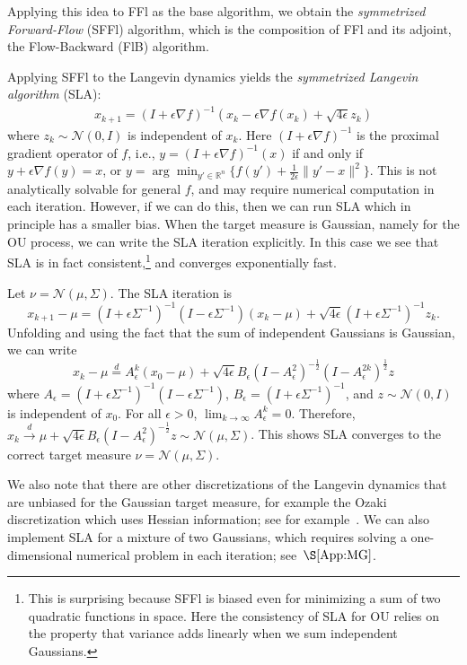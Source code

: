 \documentclass[final,12pt]{colt2018}
\newcommand{\R}{\mathbb{R}}
\newcommand{\N}{\mathcal{N}}
\begin{document}
Applying this idea to FFl as the base algorithm, we obtain the {\em symmetrized Forward-Flow} (SFFl) algorithm, which is the composition of FFl and its adjoint, the Flow-Backward (FlB) algorithm.

Applying SFFl to the Langevin dynamics yields the {\em symmetrized Langevin algorithm} (SLA):
\begin{align}\label{Eq:SLA}
x_{k+1} = (I + \epsilon \nabla f)^{-1}(x_k-\epsilon \nabla f(x_k) + \sqrt{4\epsilon} z_k)
\end{align}
where $z_k \sim \N(0,I)$ is independent of $x_k$.
Here $(I+\epsilon \nabla f)^{-1}$ is the proximal gradient operator of $f$, i.e., $y = (I+\epsilon \nabla f)^{-1}(x)$ if and only if $y + \epsilon \nabla f(y) = x$, or $y = \arg\min_{y' \in \R^n} \{ f(y') + \frac{1}{2\epsilon} \|y'-x\|^2\}$.
This is not analytically solvable for general $f$, and may require numerical computation in each iteration.
However, if we can do this, then we can run SLA which in principle has a smaller bias.
When the target measure is Gaussian, namely for the OU process, we can write the SLA iteration explicitly.
In this case we see that SLA is in fact consistent,\footnote{
This is surprising because SFFl is biased even for minimizing a sum of two quadratic functions in space. 
Here the consistency of SLA for OU relies on the property that variance adds linearly when we sum independent Gaussians.
}
and converges exponentially fast.


\begin{example}\label{Ex:OUSLA}
Let $\nu = \N(\mu,\Sigma)$.
The SLA iteration is 
$$x_{k+1}-\mu = (I+\epsilon \Sigma^{-1})^{-1}(I-\epsilon \Sigma^{-1})(x_k-\mu) + \sqrt{4\epsilon} (I+\epsilon \Sigma^{-1})^{-1} z_k.$$
Unfolding and using the fact that the sum of independent Gaussians is Gaussian, we can write
$$x_k - \mu \stackrel{d}{=} A_\epsilon^k(x_0-\mu) + \sqrt{4\epsilon} B_\epsilon (I-A_\epsilon^2)^{-\frac{1}{2}} (I-A_\epsilon^{2k})^{\frac{1}{2}} z$$
where $A_\epsilon = (I+\epsilon \Sigma^{-1})^{-1}(I-\epsilon \Sigma^{-1})$, $B_\epsilon = (I+\epsilon \Sigma^{-1})^{-1}$, and $z \sim \N(0,I)$ is independent of $x_0$.
For all $\epsilon > 0$, $\lim_{k \to \infty} A_\epsilon^k = 0$.
Therefore, $x_k \stackrel{d}{\to} \mu + \sqrt{4\epsilon} B_\epsilon (I-A_\epsilon^2)^{-\frac{1}{2}} z \sim \N(\mu,\Sigma)$.
This shows SLA converges to the correct target measure $\nu = \N(\mu,\Sigma)$.
\end{example}

We also note that there are other discretizations of the Langevin dynamics that are unbiased for the Gaussian target measure, for example the Ozaki discretization which uses Hessian information; see for example~\citep{D17}.
We can also implement SLA for a mixture of two Gaussians, which requires solving a one-dimensional numerical problem in each iteration;
see~$\S\ref{App:MG}$.
\end{document}
